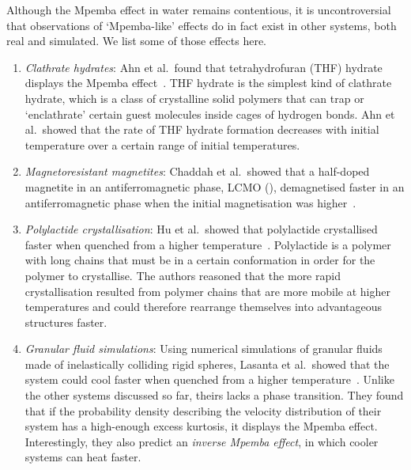 \documentclass[hyperref={colorlinks=true, urlcolor=blue, citecolor=blue, final, bound}]{sfuthesis}
\begin{document}
Although the Mpemba effect in water remains contentious, it is uncontroversial that observations of `Mpemba-like' effects do in fact exist in other systems, both real and simulated. We list some of those effects here.
\begin{enumerate}
    \item \textit{Clathrate hydrates}: Ahn et al.\ found that tetrahydrofuran (THF) hydrate displays the Mpemba effect~\cite{Ahn2016}. THF hydrate is the simplest kind of clathrate hydrate, which is a class of crystalline solid polymers that can trap or `enclathrate' certain guest molecules inside cages of hydrogen bonds. Ahn et al.\ showed that the rate of THF hydrate formation decreases with initial temperature over a certain range of initial temperatures.
    \item \textit{Magnetoresistant magnetites}: Chaddah et al.\ showed that a half-doped magnetite in an antiferromagnetic phase, LCMO (), demagnetised faster in an antiferromagnetic phase when the initial magnetisation was higher~\cite{Chaddah2010}. 
    \item \textit{Polylactide crystallisation}: Hu et al.\ showed that polylactide crystallised faster when quenched from a higher temperature~\cite{Hu2018}. Polylactide is a polymer with long chains that must be in a certain conformation in order for the polymer to crystallise. The authors reasoned that the more rapid crystallisation resulted from polymer chains that are more mobile at higher temperatures and could therefore rearrange themselves into advantageous structures faster.
    \item \textit{Granular fluid simulations}: Using numerical simulations of granular fluids made of inelastically colliding rigid spheres, Lasanta et al.\ showed that the system could cool faster when quenched from a higher temperature~\cite{Lasanta2017}. Unlike the other systems discussed so far, theirs lacks a phase transition. They found that if the probability density describing the velocity distribution of their system has a high-enough excess kurtosis, it displays the Mpemba effect. Interestingly, they also predict an \textit{inverse Mpemba effect}, in which cooler systems can heat faster. 
\end{enumerate}
\end{document}
